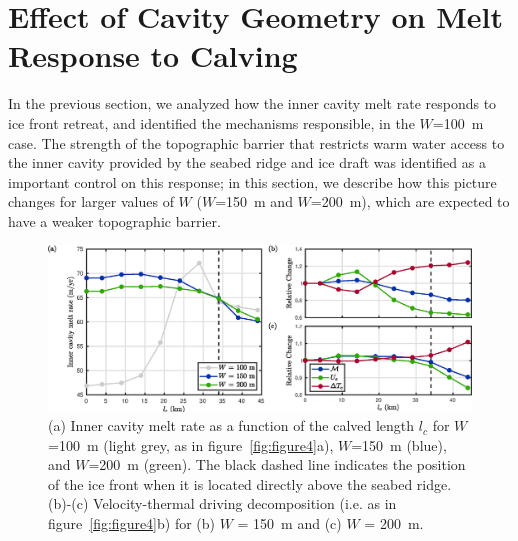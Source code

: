 \documentclass[draft]{agujournal2019}
\begin{document}
\section{Effect of Cavity Geometry on Melt Response to Calving}\label{S:Results:H}
In the previous section, we analyzed how the inner cavity melt rate responds to ice front retreat, and identified the mechanisms responsible, in the $W$=100~m case. The strength of the topographic barrier that restricts warm water access to the inner cavity provided by the seabed ridge and ice draft was identified as a important control on this response; in this section, we describe how this picture changes for larger values of $W$ ($W$=150~m and $W$=200~m), which are expected to have a weaker topographic barrier.



\begin{figure}
    \centering
    \includegraphics[width = \textwidth]{../make_figures/plots/figure6.eps}
    \caption{(a) Inner cavity melt rate as a function of the calved length $l_c$ for $W$=100~m (light grey, as in figure~\ref{fig:figure4}a), $W$=150~m (blue), and $W$=200~m (green). The black dashed line indicates the position of the ice front when it is located directly above the seabed ridge. (b)-(c) Velocity-thermal driving decomposition (i.e. as in figure~\ref{fig:figure4}b) for (b) $W$ = 150~m and (c) $W$ = 200~m.}
    \label{fig:figure6}
\end{figure}
\end{document}
